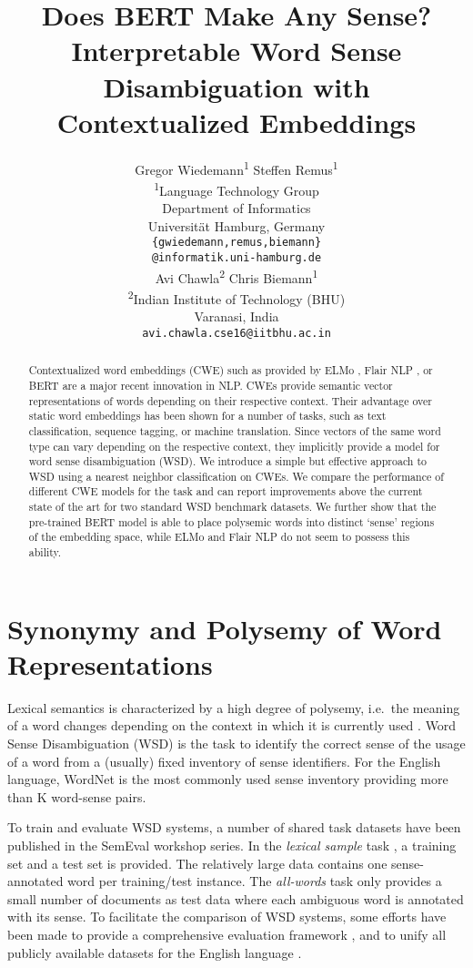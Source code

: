 \documentclass[11pt]{article}
\title{Does {BERT} Make Any Sense? \\{I}nterpretable Word Sense Disambiguation with Contextualized Embeddings}
\author{Gregor Wiedemann\textsuperscript{1} \quad Steffen Remus\textsuperscript{1} \\
\textsuperscript{1}Language Technology Group\\ 
Department of Informatics\\ 
Universit\"{a}t Hamburg, Germany\\
{\tt \{gwiedemann,remus,biemann\}} \\
{\tt @informatik.uni-hamburg.de} \\ \And
Avi Chawla\textsuperscript{2} \quad Chris Biemann\textsuperscript{1} \\
\textsuperscript{2}Indian Institute of Technology (BHU) \\
Varanasi, India \\
{\tt avi.chawla.cse16@iitbhu.ac.in}}
\date{}
\begin{document}
\maketitle
\begin{abstract}
Contextualized word embeddings (CWE) such as provided by ELMo \cite{peters.2018}, Flair NLP \cite{akbik.2018}, or BERT \cite{devlin.2019} are a major recent innovation in NLP. 
CWEs provide semantic vector representations of words depending on their respective context.
Their advantage over static word embeddings has been shown for a number of tasks, such as text classification, sequence tagging, or machine translation. 
Since vectors of the same word type can vary depending on the respective context, they implicitly provide a model for word sense disambiguation (WSD). 
We introduce a simple but effective approach to WSD using a nearest neighbor classification on CWEs.
We compare the performance of different CWE models for the task and can report improvements above the current state of the art for two standard WSD benchmark datasets.
We further show that the pre-trained BERT model is able to place polysemic words into distinct `sense' regions of the embedding space, while ELMo and Flair NLP do not seem to possess this ability.
\end{abstract}

\section{Synonymy and Polysemy of Word Representations}
Lexical semantics is characterized by a high degree of polysemy, i.e.\ the meaning of a word changes depending on the context in which it is currently used \cite{harris:54:dh}.
Word Sense Disambiguation (WSD) is the task to identify the correct sense of the usage of a word from a (usually) fixed inventory of sense identifiers. 
For the English language, WordNet \cite{fellbaum.1998} is the most commonly used sense inventory providing more than K word-sense pairs. 

To train and evaluate WSD systems, a number of shared task datasets have been published in the SemEval workshop series. In the \textit{lexical sample} task \cite{kilgarriff-2001-english,mihalcea-etal-2004-senseval}, a training set and a test set is provided. The relatively large data contains one sense-annotated word per training/test instance. The \textit{all-words} task \cite{edmonds.2001,snyder.2004} only provides a small number of documents as test data where each ambiguous word is annotated with its sense.
To facilitate the comparison of WSD systems, some efforts have been made to provide a comprehensive evaluation framework \cite{raganato.2017}, and to unify all publicly available datasets for the English language \cite{viali.2018}.
\end{document}
